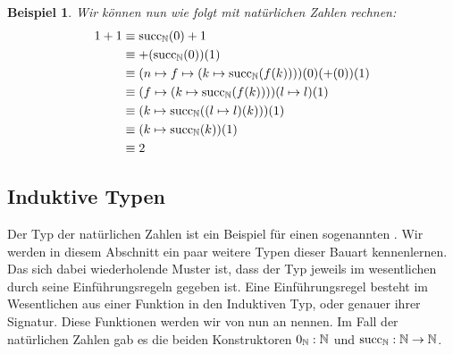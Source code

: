 \documentclass[a4paper,12pt]{article}
\theoremstyle{break}
\newtheorem{beispiel}[theorem]{Beispiel}
\theoremstyle{nonumberbreak}
\theoremstyle{nonumberplain}
\begin{document}
\begin{beispiel}
  Wir können nun wie folgt mit natürlichen Zahlen rechnen:
  \begin{align*}
    1+1 & \equiv \mathrm{succ}_{\mathbb{N}}(0)+1 \\
        & \equiv +(\mathrm{succ}_{\mathbb{N}}(0))(1) \\
        & \equiv (n \mapsto f \mapsto (k \mapsto \mathrm{succ}_{\mathbb{N}}(f(k))))(0)(+(0))(1) \\
        & \equiv (f \mapsto (k \mapsto \mathrm{succ}_{\mathbb{N}}(f(k))))(l \mapsto l)(1) \\
        & \equiv (k \mapsto \mathrm{succ}_{\mathbb{N}}((l \mapsto l)(k)))(1) \\
        & \equiv (k \mapsto \mathrm{succ}_{\mathbb{N}}(k))(1) \\
        & \equiv 2 \\
  \end{align*}
\end{beispiel}

\subsection{Induktive Typen}
Der Typ der natürlichen Zahlen ist ein Beispiel für einen sogenannten .
Wir werden in diesem Abschnitt ein paar weitere Typen dieser Bauart kennenlernen.
Das sich dabei wiederholende Muster ist, dass der Typ jeweils im wesentlichen durch seine Einführungsregeln gegeben ist.
Eine Einführungsregel besteht im Wesentlichen aus einer Funktion in den Induktiven Typ, oder genauer ihrer Signatur.
Diese Funktionen werden wir von nun an  nennen.
Im Fall der natürlichen Zahlen gab es die beiden Konstruktoren $0_{\mathbb{N}}:\mathbb{N}$ und $\mathrm{succ}_{\mathbb{N}}:\mathbb{N}\to\mathbb{N}$.
\end{document}
